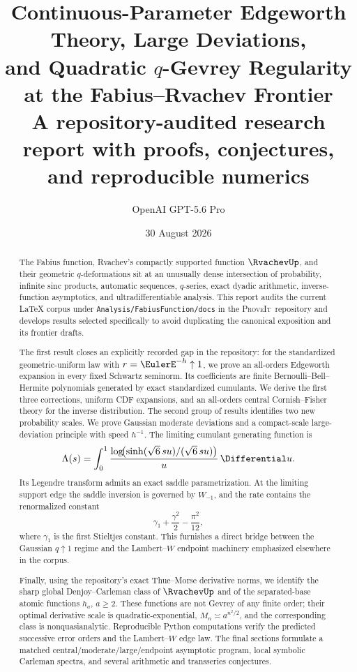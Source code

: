 \documentclass[11pt]{article}
\title{\textbf{Continuous-Parameter Edgeworth Theory, Large Deviations,\\
and Quadratic \texorpdfstring{$q$}{q}-Gevrey Regularity\\
at the Fabius--Rvachev Frontier}\\[0.7em]
\large A repository-audited research report with proofs, conjectures, and reproducible numerics}
\author{OpenAI GPT-5.6 Pro}
\date{30 August 2026}
\numberwithin{equation}{section}
\theoremstyle{definition}
\newcommand{\repo}{\textsc{ProveIt}}
\begin{document}
\maketitle

\begin{abstract}
The Fabius function, Rvachev's compactly supported function \(\RvachevUp\), and their geometric \(q\)-deformations sit at an unusually dense intersection of probability, infinite sinc products, automatic sequences, \(q\)-series, exact dyadic arithmetic, inverse-function asymptotics, and ultradifferentiable analysis.  This report audits the current LaTeX corpus under \texttt{Analysis/FabiusFunction/docs} in the \repo\ repository and develops results selected specifically to avoid duplicating the canonical exposition and its frontier drafts.

The first result closes an explicitly recorded gap in the repository: for the standardized geometric-uniform law with \(r=\EulerE^{-h}\uparrow1\), we prove an all-orders Edgeworth expansion in every fixed Schwartz seminorm.  Its coefficients are finite Bernoulli--Bell--Hermite polynomials generated by exact standardized cumulants.  We derive the first three corrections, uniform CDF expansions, and an all-orders central Cornish--Fisher theory for the inverse distribution.  The second group of results identifies two new probability scales.  We prove Gaussian moderate deviations and a compact-scale large-deviation principle with speed \(h^{-1}\).  The limiting cumulant generating function is
\[
 \Lambda(s)=\int_0^1\frac{\log\!\bigl(\sinh(\sqrt6\,su)/(\sqrt6\,su)\bigr)}{u}\,\Differential u.
\]
Its Legendre transform admits an exact saddle parametrization.  At the limiting support edge the saddle inversion is governed by \(W_{-1}\), and the rate contains the renormalized constant
\[
 \gamma_1+\frac{\gamma^2}{2}-\frac{\pi^2}{12},
\]
where \(\gamma_1\) is the first Stieltjes constant.  This furnishes a direct bridge between the Gaussian \(q\uparrow1\) regime and the Lambert--\(W\) endpoint machinery emphasized elsewhere in the corpus.

Finally, using the repository's exact Thue--Morse derivative norms, we identify the sharp global Denjoy--Carleman class of \(\RvachevUp\) and of the separated-base atomic functions \(h_a\), \(a\ge2\).  These functions are not Gevrey of any finite order; their optimal derivative scale is quadratic-exponential, \(M_n\asymp a^{n^2/2}\), and the corresponding class is nonquasianalytic.  Reproducible Python computations verify the predicted successive error orders and the Lambert--\(W\) edge law.  The final sections formulate a matched central/moderate/large/endpoint asymptotic program, local symbolic Carleman spectra, and several arithmetic and transseries conjectures.
\end{abstract}
\end{document}
